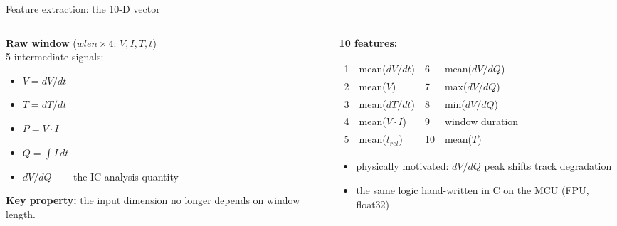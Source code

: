 \documentclass[11pt,aspectratio=169]{beamer}
\begin{document}
\begin{frame}{Feature extraction: the 10-D vector}
  \begin{columns}[T]
    \begin{column}{0.42\textwidth}
      \textbf{Raw window} ($wlen \times 4$: $V, I, T, t$)\\[0.4em]
      {\small 5 intermediate signals:}\\[0.2em]
      \begin{itemize}
        \item $\dot V = dV/dt$
        \item $\dot T = dT/dt$
        \item $P = V \cdot I$
        \item $Q = \int I\,dt$
        \item $dV/dQ$ \ --- the IC-analysis quantity
      \end{itemize}
      \vspace{0.3em}
      \textbf{Key property:} the input dimension no longer depends on window length.
    \end{column}
    \begin{column}{0.52\textwidth}
      \textbf{10 features:}\\[0.3em]
      {\small
      \begin{tabular}{@{}ll@{\quad}ll@{}}
        1 & mean($dV/dt$) & 6 & mean($dV/dQ$)\\
        2 & mean($V$) & 7 & max($dV/dQ$)\\
        3 & mean($dT/dt$) & 8 & min($dV/dQ$)\\
        4 & mean($V \cdot I$) & 9 & window duration\\
        5 & mean($t_{rel}$) & 10 & mean($T$)\\
      \end{tabular}}
      \vspace{0.4em}
      \begin{itemize}
        \item physically motivated: $dV/dQ$ peak shifts track degradation
        \item the same logic hand-written in C on the MCU (FPU, float32)
      \end{itemize}
    \end{column}
  \end{columns}
\end{frame}
\end{document}
